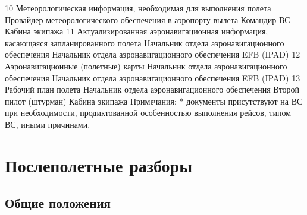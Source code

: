 10	Метеорологическая информация, необходимая для выполнения полета	Провайдер метеорологического обеспечения в аэропорту вылета	Командир ВС	Кабина экипажа
11	Актуализированная аэронавигационная информация, касающаяся запланированного полета	Начальник отдела аэронавигационного обеспечения	Начальник отдела аэронавигационного обеспечения	EFB (IPAD)
12	Аэронавигационные (полетные) карты	Начальник отдела аэронавигационного обеспечения	Начальник отдела аэронавигационного обеспечения	EFB (IPAD)
13	Рабочий план полета	Начальник отдела аэронавигационного обеспечения	Второй пилот (штурман)	Кабина экипажа
Примечания:
*	документы присутствуют на ВС при необходимости, продиктованной особенностью выполнения рейсов, типом ВС, иными причинами.



\section{Послеполетные разборы}

\subsection{Общие положения}

